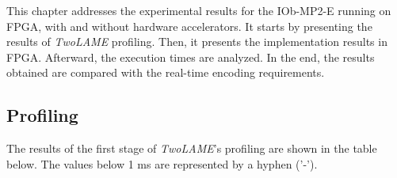 


This chapter addresses the experimental results for the IOb-MP2-E running on FPGA, with and without hardware accelerators.
It starts by presenting the results of \textit{TwoLAME} profiling. Then, it presents the implementation results in FPGA. Afterward, the execution times are analyzed. In the end, the results obtained are compared with the real-time encoding requirements.

\subsection{Profiling}

The results of the first stage of \textit{TwoLAME}'s profiling are shown in the table below. The values below 1 ms are represented by a hyphen ('-').


